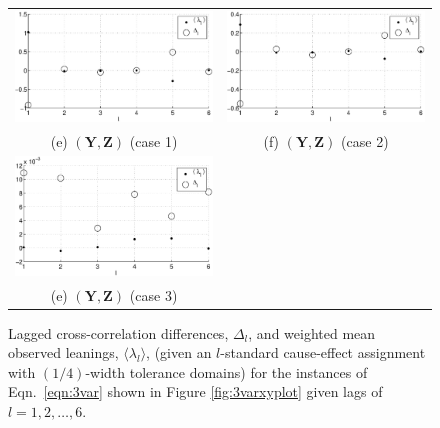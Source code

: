 \begin{figure}[ht]
\begin{center}
\begin{tabular}{cc}
\includegraphics[scale=0.48]{NoisyMultiResponseExample_LandLCC_YZ1.eps} & \includegraphics[scale=0.48]{NoisyMultiResponseExample_LandLCC_YZ2.eps} \\
(e) $(\mathbf{Y},\mathbf{Z})$ (case 1) & (f) $(\mathbf{Y},\mathbf{Z})$ (case 2)\\
\includegraphics[scale=0.48]{NoisyMultiResponseExample_LandLCC_YZ3.eps} &  \\
(e) $(\mathbf{Y},\mathbf{Z})$ (case 3) & 
\end{tabular}
\end{center}
\caption{Lagged cross-correlation differences, $\Delta_l$, and weighted mean observed leanings, $\langle\lambda_l\rangle$, (given an $l$-standard cause-effect assignment with $(1/4)$-width tolerance domains) for the instances of Eqn.\ \ref{eqn:3var} shown in Figure \ref{fig:3varxyplot} given lags of $l=1,2,\ldots,6$.}
\label{fig:3varxyLandLCC}
\end{figure}

